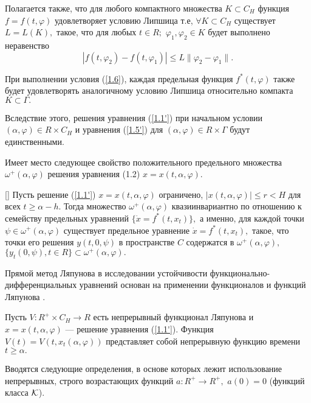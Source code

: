 	Полагается также, что для любого компактного множества $K\subset C_H$
		функция $f=f(t,\varphi )$ удовлетворяет условию Липшица т.е, $\forall K\subset C_H$ существует $L=L(K),$ такое, что  для любых
		$t\in R;$ $\varphi _1, \varphi _2\in K$ будет выполнено неравенство
		\begin{equation}
		|f(t,\varphi _2)-f(t,\varphi _1)|\le L\|\varphi _2-\varphi _1\|.
		\label{1.6}
		\end{equation}
	
	При выполнении условия (\ref{1.6}), каждая
	предельная функция $f^*(t,\varphi )$ также будет удовлетворять
	аналогичному условию Липшица относительно компакта
	$K\subset\Gamma.$
	
	Вследствие этого, решения
	уравнения (\ref{1.1'}) при начальном условии $(\alpha,\varphi )\in R 
	\times C_H$ и уравнения (\ref{1.5'}) для $(\alpha,\varphi )\in R
	\times\Gamma $ будут единственными.

	
	Имеет место следующее свойство положительного предельного множества $\omega^{+} (\alpha, \varphi)$ решения уравнения (1.2) $x = x(t, \alpha, \varphi).$
	
	\begin{theorem}\label{t-1.2}  [] Пусть  решение  (\ref{1.1'}) $x=x(t,\alpha ,\varphi )$
		ограничено, $|x(t,\alpha ,\varphi)|\le r<H$ для всех $t\ge \alpha
		-h.$ Тогда множество $\omega ^+(\alpha ,\varphi )$
		квазиинвариантно по отношению к семейству предельных уравнений
		$\{\dot x=f^*(t,x_t)\},$ а именно,  для  каждой точки $\psi\in\omega
		^+(\alpha ,\varphi )$ существует предельное уравнение $\dot
		x=f^*(t,x_t),$ такое, что точки его решения
		$y(t,0,\psi )$ в пространстве $C$ содержатся в $\omega^+(\alpha,\varphi ),$
		$\{ y_t(0,\psi ), t\in R\}\subset\omega ^+(\alpha ,\varphi ).$
	\end{theorem}
	
	Прямой метод Ляпунова в исследовании устойчивости функ\-ци\-о\-наль\-но-диф\-фе\-рен\-ци\-аль\-ных
	уравнений основан на применении функционалов и функций Ляпунова \cite{}.
	
	Пусть $V:R^+\times C_H\to R$ есть непрерывный функционал Ляпунова и
	$x=x(t,\alpha ,\varphi )$ ---
	решение уравнения (\ref{1.1'}). Функция $V(t)=V(t,x_t(\alpha
	,\varphi ))$ представляет собой непрерывную функцию времени
	$t\ge\alpha.$
	
	Вводятся следующие
	определения, в основе которых лежит использование непрерывных,
	строго возрастающих функций
	$a:R^+\to R^+,$ $a(0)=0$ (функций класса $\cal K$).
	
